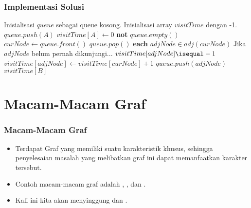 \begin{frame}[fragile]
\frametitle{Implementasi Solusi}
\begin{codebox}
  \li \Comment Inisialisasi $queue$ sebagai queue kosong.
  \li \Comment Inisialisasi array $visitTime$ dengan -1.
  \li $queue.push(A)$
  \li $visitTime[A] \gets 0$
  \li \While \textbf{not} $queue.empty()$ \Do
  \li   $curNode \gets queue.front()$
  \li   $queue.pop()$
  \li   \For \textbf{each} $adjNode \in adj(curNode)$ \Do
  \li     \Comment Jika $adjNode$ belum pernah dikunjungi...
  \li     \If $visitTime[adjNode] \isequal -1$ \Then
  \li       $visitTime[adjNode] \gets visitTime[curNode] + 1$
  \li       $queue.push(adjNode)$
          \End
        \End
      \End
  \li \Return $visitTime[B]$
\end{codebox}
\end{frame}

\section{Macam-Macam Graf}
\frame{\sectionpage}

\begin{frame}
\frametitle{Macam-Macam Graf}
\begin{itemize}
  \item Terdapat Graf yang memiliki suatu karakteristik khusus, sehingga penyelesaian masalah yang melibatkan graf ini dapat memanfaatkan karakter tersebut.
  \item Contoh macam-macam graf adalah , , dan .
  \item Kali ini kita akan menyinggung \ftree dan .
\end{itemize}
\end{frame}

